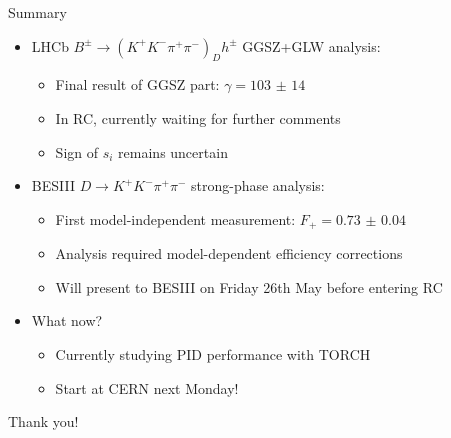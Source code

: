 \documentclass{beamer}
\begin{document}
\begin{frame}{Summary}
  \begin{itemize}
    \setlength\itemsep{1.0em}
    \item{LHCb $B^\pm\to(K^+K^-\pi^+\pi^-)_Dh^\pm$ GGSZ+GLW analysis:}
    \begin{itemize}
      \setlength\itemsep{0.0em}
      \item{Final result of GGSZ part: $\gamma = \SI{103(14)}{}$}
      \item{In RC, currently waiting for further comments}
      \item{Sign of $s_i$ remains uncertain}
    \end{itemize}
    \item{BESIII $D\to K^+K^-\pi^+\pi^-$ strong-phase analysis:}
    \begin{itemize}
      \setlength\itemsep{0.0em}
      \item{First model-independent measurement: $F_+ = \SI{0.73(4)}{}$}
      \item{Analysis required model-dependent efficiency corrections}
      \item{Will present to BESIII on Friday 26th May before entering RC}
    \end{itemize}
    \item{What now?}
    \begin{itemize}
      \item{Currently studying PID performance with TORCH}
      \item{Start at CERN next Monday!}
    \end{itemize}
  \end{itemize}
  \begin{center}
    \huge Thank you!
  \end{center}
\end{frame}
\end{document}
